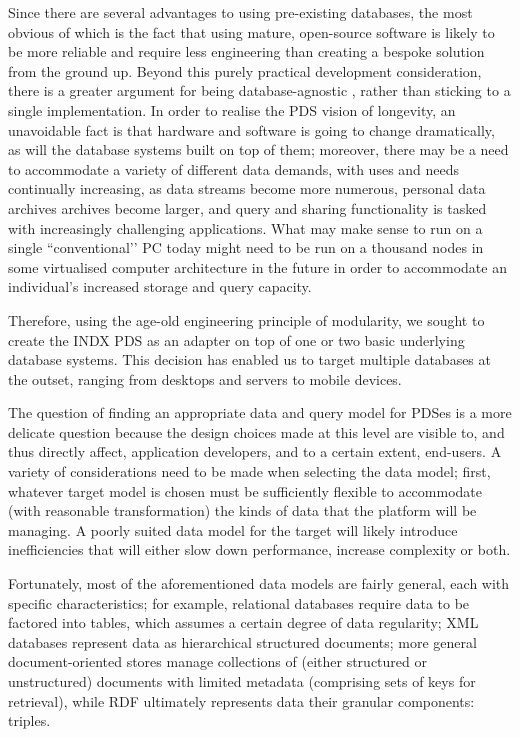\documentclass[graybox]{svmult}
\begin{document}
Since there are several advantages to using pre-existing databases, the most obvious of which is the fact that using mature, open-source software is likely to be more reliable and require less engineering than creating a bespoke solution from the ground up. Beyond this purely practical development consideration, there is a greater argument for being database-agnostic \cite{databseagnostic}, rather than sticking to a single implementation.  In order to realise the PDS vision of longevity, an unavoidable fact is that hardware and software is going to change dramatically, as will the database systems built on top of them; moreover, there may be a need to accommodate a variety of different data demands, with uses and needs continually increasing, as data streams become more numerous, personal data archives archives become larger, and query and sharing functionality is tasked with increasingly challenging applications.  What may make sense to run on a single ``conventional’’ PC today might need to be run on a thousand nodes in some virtualised computer architecture in the future in order to accommodate an individual’s increased storage and query capacity.

Therefore, using the age-old engineering principle of modularity, we sought to create the INDX PDS as an adapter on top of one or two basic underlying database systems.  This decision has enabled us to target multiple databases at the outset, ranging from desktops and servers to mobile devices. 

The question of finding an appropriate data and query model for PDSes is a more delicate question because the design choices made at this level are visible to, and thus directly affect, application developers, and to a certain extent, end-users.  A variety of considerations need to be made when selecting the data model; first, whatever target model is chosen must be sufficiently flexible to accommodate (with reasonable transformation) the kinds of data that the platform will be managing.  A poorly suited data model for the target will likely introduce inefficiencies that will either slow down performance, increase complexity or both.

Fortunately, most of the aforementioned data models are fairly general, each with specific characteristics; for example, relational databases require data to be factored into tables, which assumes a certain degree of data regularity; XML databases represent data as hierarchical structured documents; more general document-oriented stores manage collections of (either structured or unstructured) documents with limited metadata (comprising sets of keys for retrieval), while RDF ultimately represents data their granular components: triples.  
\end{document}

